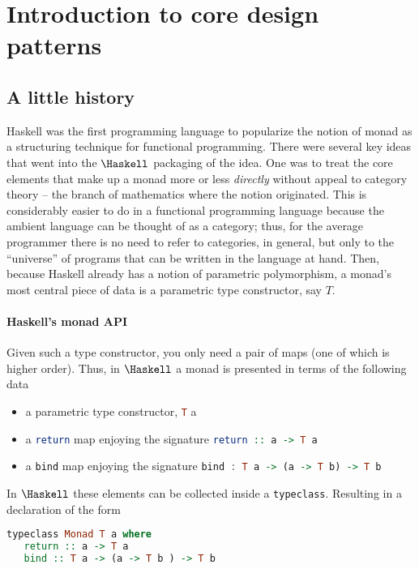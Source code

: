 \section{Introduction to core design patterns}

\subsection{A little history}
Haskell was the first programming language to popularize the notion of
monad as a structuring technique for functional programming. There
were several key ideas that went into the $\Haskell$ packaging of the
idea. One was to treat the core elements that make up a monad more or
less \emph{directly} without appeal to category theory -- the branch
of mathematics where the notion originated. This is considerably
easier to do in a functional programming language because the ambient
language can be thought of as a category; thus, for the average
programmer there is no need to refer to categories, in general, but
only to the ``universe'' of programs that can be written in the
language at hand. Then, because Haskell already has a notion of
parametric polymorphism, a monad's most central piece of data is a
parametric type constructor, say $T$.

\paragraph{Haskell's monad API}
Given such a type constructor, you only need a pair of maps (one of
which is higher order). Thus, in $\Haskell$ a monad is presented in
terms of the following data

\begin{itemize}
  \item a parametric type constructor, \lstinline[language=Haskell]!T! a
  \item a \lstinline[language=Haskell]!return! map enjoying the
    signature \lstinline[language=Haskell]!return :: a -> T a!
  \item a \lstinline[language=Haskell]!bind! map enjoying the
    signature \lstinline[language=Haskell]!bind : T a -> (a -> T b) -> T b!
\end{itemize}

In $\Haskell$ these elements can be collected inside a
\lstinline[language=Haskell]!typeclass!. Resulting in a declaration of
the form

\begin{lstlisting}[captionpos=b,language=Haskell,caption=monad typeclass]
  typeclass Monad T a where
   return :: a -> T a
   bind :: T a -> (a -> T b ) -> T b
\end{lstlisting}


